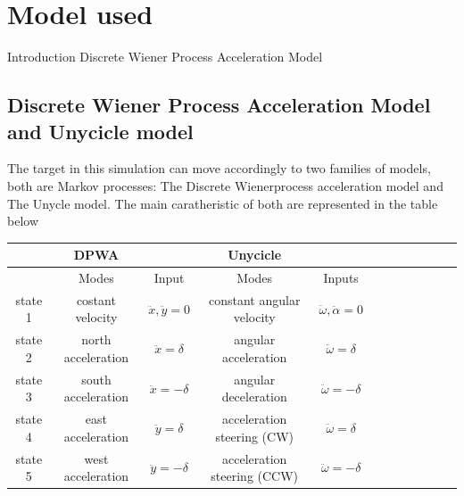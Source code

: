 \documentclass[twocolumn]{article}
\begin{document}
    \section*{Model used}
    Introduction
    Discrete Wiener Process Acceleration Model
    \subsection*{ Discrete Wiener Process Acceleration Model and Unycicle model}
    The target in this simulation can move accordingly to two families of models, both are Markov processes: 
    The Discrete Wienerprocess acceleration model and The Unycle model. The main caratheristic of both are represented in the table below
    \\
    \begin{tabular}{||c |c  | c  |c|c|c|c|c c c c c||}%
        \hline
         & DPWA && Unycicle \\
        \hline
             & Modes & Input & Modes & Inputs\\ [0.5ex]
        \hline\hline
        state 1 & costant velocity      & $\ddot{x},\ddot{y}=0$ & constant angular velocity &  $\ddot{\omega},\ddot{\alpha}=0$   \\
        \hline
        state 2  & north acceleration      & $\ddot{x}=\delta$  &  angular acceleration &  $\ddot{\omega}=\delta$ \\
        \hline
        state 3  & south acceleration    & $\ddot{x}=-\delta$   &  angular deceleration  & $\ddot{\omega}=-\delta$ \\
        \hline
        state 4  & east acceleration    & $\ddot{y}=\delta$    & acceleration steering (CW) & $\ddot{\omega}=\delta$ \\
        \hline
        state 5  & west acceleration     & $\ddot{y}=-\delta$  &  acceleration steering (CCW) & $\ddot{\omega}=-\delta$ \\ [1ex]
        \hline
    \end{tabular}
    \\
    
\end{document}
